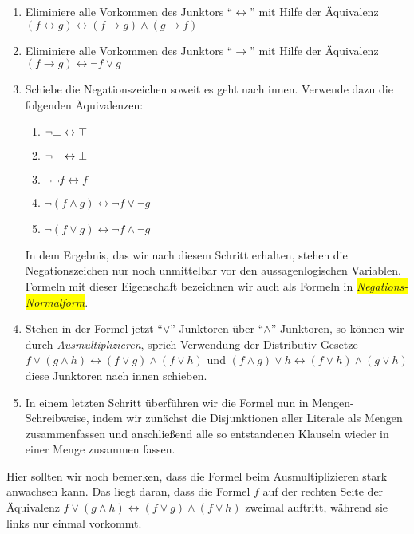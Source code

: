 \begin{enumerate}
\item Eliminiere alle Vorkommen des Junktors ``$\leftrightarrow$'' mit Hilfe der \"{A}quivalenz \\[0.2cm]
      \hspace*{1.3cm} 
      $(f \leftrightarrow g) \leftrightarrow (f \rightarrow g) \wedge (g \rightarrow f)$
\item Eliminiere alle Vorkommen des Junktors ``$\rightarrow$'' mit Hilfe der \"{A}quivalenz \\[0.2cm]
      \hspace*{1.3cm} 
      $(f \rightarrow g) \leftrightarrow \neg f \vee g$
\item Schiebe die Negationszeichen soweit es geht nach innen.  Verwende dazu die folgenden \"{A}quivalenzen:
      \begin{enumerate}
      \item $\neg \bot \leftrightarrow \top$
      \item $\neg \top \leftrightarrow \bot$
      \item $\neg \neg f \leftrightarrow f$
      \item $\neg (f \wedge g) \leftrightarrow  \neg f \vee   \neg g$ 
      \item $\neg (f \vee   g) \leftrightarrow  \neg f \wedge \neg g$ 
      \end{enumerate}
      In dem Ergebnis, das wir nach diesem Schritt erhalten, stehen die Negationszeichen
      nur noch unmittelbar vor den aussagenlogischen Variablen.  Formeln mit dieser
      Eigenschaft bezeichnen wir auch als Formeln in \colorbox{yellow}{\emph{Negations-Normalform}}.
\item Stehen in der Formel jetzt ``$\vee$''-Junktoren \"{u}ber ``$\wedge$''-Junktoren, so k\"{o}nnen wir durch
      \emph{Ausmultiplizieren}, sprich Verwendung der Distributiv-Gesetze \\[0.2cm]
      \hspace*{1.3cm} 
      $f \vee (g \wedge h) \leftrightarrow (f \vee g) \wedge (f \vee h)$ \quad und \quad
      $(f \wedge g) \vee h \leftrightarrow (f \vee h) \wedge (g \vee h)$ 
      \\[0.2cm]
      diese Junktoren nach innen schieben.
\item In einem letzten Schritt \"{u}berf\"{u}hren wir die Formel nun in Mengen-Schreibweise, indem
      wir zun\"{a}chst die Disjunktionen aller Literale als Mengen zusammenfassen und anschlie\ss{}end
      alle so entstandenen Klauseln wieder in einer Menge zusammen fassen.
\end{enumerate}
Hier sollten wir noch bemerken, dass die Formel beim Ausmultiplizieren stark anwachsen kann.
Das liegt daran, dass die Formel $f$ auf der rechten Seite der \"{A}quivalenz 
$f \vee (g \wedge h) \leftrightarrow (f \vee g) \wedge (f \vee h)$ zweimal auftritt, w\"{a}hrend sie
links nur einmal      vorkommt. 

